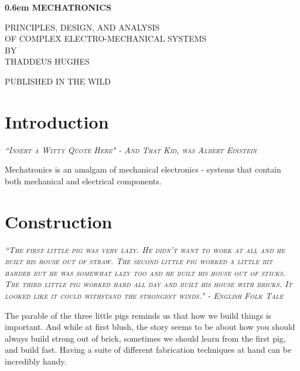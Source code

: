 \documentclass[10pt,letterpaper]{book}
\begin{document}
\clearpage
\newcommand\nbvspace[1][3]{\vspace*{\stretch{#1}}}
\newcommand\nbstretchyspace{\spaceskip0.5em plus 0.25em minus 0.25em}
\newcommand{\nbtitlestretch}{\spaceskip0.6em}
\pagestyle{empty}
\begin{center}
  \bfseries
  \nbvspace[1]
  \Huge
  {\nbtitlestretch\huge
    MECHATRONICS}

  \nbvspace[1]
  \normalsize
  PRINCIPLES, DESIGN, AND ANALYSIS\\
  OF COMPLEX ELECTRO-MECHANICAL SYSTEMS\\
  
  \nbvspace[1]
  \small BY\\
  \Large THADDEUS HUGHES\\[0.5em]

  \nbvspace[2]

  \nbvspace[3]
  \normalsize

  \large
  PUBLISHED IN THE WILD
  \nbvspace[1]
\end{center}


\tableofcontents

\chapter{Introduction}
 
 {\slshape \scshape ``Insert a Witty Quote Here" - And That Kid, was Albert Einstein}

Mechatronics is an amalgam of mechanical electronics - systems that contain both mechanical and electrical components.

\chapter{Construction}
 
 {\slshape \scshape ``The first little pig was very lazy. He didn't want to work at all and he built his house out of straw. The second little pig worked a little bit harder but he was somewhat lazy too and he built his house out of sticks. The third little pig worked hard all day and built his house with bricks. It looked like it could withstand the strongest winds." - English Folk Tale}
 
 The parable of the three little pigs reminds us that how we build things is important. And while at first blush, the story seems to be about how you should always build strong out of brick, sometimes we should learn from the first pig, and build fast. Having a suite of different fabrication techniques at hand can be incredibly handy.
 
\end{document}

